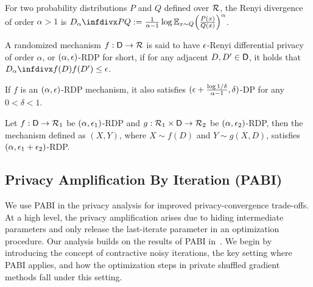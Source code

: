 \begin{definition}
\label{def:renyi_divergence}
    For two probability distributions $P$ and $Q$ defined over ${\mathcal{R}}$, the Renyi divergence of order $\alpha > 1$ is
    $\infdivalpha{P}{Q} := \frac{1}{\alpha-1}\log \E_{x \sim Q} \Big(\frac{P(x)}{Q(x)}\Big)^{\alpha}$.
\end{definition}


\begin{definition}
\label{def:RDP}
    A randomized mechanism $f: {\mathsf{D}}\rightarrow {\mathcal{R}}$ is said to have ${\epsilon}$-Renyi differential privacy of order $\alpha$, or $(\alpha, {\epsilon})$-RDP for short, if for any adjacent $D, D' \in {\mathsf{D}}$, it holds that $\infdivalpha{f(D)}{f(D')} \leq \eps$.
\end{definition}

\begin{proposition}
\label{prop:rdp_to_dp}
    If $f$ is an $(\alpha, {\epsilon})$-RDP mechanism, it also satisfies $({\epsilon} + \frac{\log 1/\delta}{\alpha - 1}, \delta)$-DP for any $0 < \delta < 1$. 
\end{proposition}

\begin{proposition}
\label{prop:rdp_composition}
    Let $f: {\mathsf{D}} \rightarrow {\mathcal{R}}_1$ be $(\alpha, {\epsilon}_1)$-RDP and $g: {\mathcal{R}}_1 \times {\mathsf{D}} \rightarrow {\mathcal{R}}_2$ be $(\alpha, {\epsilon}_2)$-RDP, then the mechanism defined as $(X, Y)$, where $X \sim f(D)$ and $Y \sim g(X, D)$, satisfies $(\alpha, {\epsilon}_1 + {\epsilon}_2)$-RDP. 
\end{proposition}


\subsection{Privacy Amplification By Iteration (PABI)}
\label{subsec:appendix_pabi_related}

We use PABI in the privacy analysis for improved privacy-convergence trade-offs.
At a high level, the privacy amplification arises due to hiding intermediate parameters and only release the last-iterate parameter in an optimization procedure.
Our analysis builds on the results of PABI in~\cite{Feldman2018privacy_amp_iter}. We begin by introducing the concept of contractive noisy iterations, the key setting where PABI applies, and how the optimization steps in private shuffled gradient methods fall under this setting.

